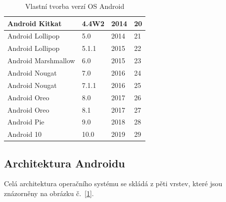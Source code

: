 \documentclass{vskpou} %
\begin{document}
\begin{center}
\begin{table}[h]
\begin{tabular}{ |p{3cm}|p{3cm}|p{3cm}|p{3cm}| }



\hline
Android Kitkat&
4.4W2&
2014&
20 \\
\hline
Android Lollipop&
5.0&
2014&
21 \\
\hline
Android Lollipop&
5.1.1&
2015&
22 \\
\hline
Android Marshmallow&
6.0&
2015&
23 \\
\hline
Android Nougat&
7.0&
2016&
24 \\
\hline
Android Nougat&
7.1.1&
2016&
25 \\
\hline
Android Oreo&
8.0&
2017&
26 \\
\hline
Android Oreo&
8.1&
2017&
27 \\
\hline
Android Pie&
9.0&
2018&
28 \\
\hline
Android 10&
10.0&
2019&
29 \\
\hline




\end{tabular}
\caption{Vlastní tvorba verzí OS Android}
\end{table}
\end{center}





\newpage
\subsection{Architektura Androidu}
Celá architektura operačního systému se skládá z pěti vrstev, které jsou znázorněny na obrázku č.~\ref{1}.
\end{document}
